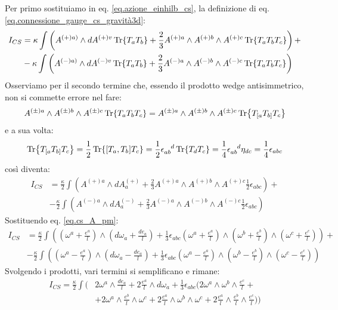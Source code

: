 Per primo sostituiamo in eq. \ref{eq.azione_einhilb_cs}, la definizione di eq. \ref{eq.connessione_gauge_cs_gravità3d}:
\begin{align*}
    I_{CS} &= \kappa\int\left( A^{(+)a)}\wedge dA^{(+)v}\Tr{T_a T_b} + \frac{2}{3}A^{(+)a}\wedge A^{(+)b}\wedge A^{(+)c}\Tr{T_aT_bT_c}\right) + \\
    &- \kappa\int\left( A^{(-)a)}\wedge dA^{(-)v}\Tr{T_a T_b} + \frac{2}{3}A^{(-)a}\wedge A^{(-)b}\wedge A^{(-)c}\Tr{T_aT_bT_c}\right)
\end{align*}      
Osserviamo per il secondo termine che, essendo il prodotto wedge antisimmetrico, non si commette errore nel fare:
\begin{equation*}
    A^{(\pm)a}\wedge A^{(\pm)b}\wedge A^{(\pm)c}\Tr{T_aT_bT_c} =  A^{(\pm)a}\wedge A^{(\pm)b}\wedge A^{(\pm)c}\Tr{T_{[a}T_{b]}T_c}
\end{equation*}
e a sua volta:
\begin{equation*}
    \Tr{T_{[a}T_{b]}T_c} = \frac{1}{2}\Tr{[T_a, T_b]T_c} = \frac{1}{2}\tensor{\epsilon}{_{ab}^d}\Tr{T_dT_c} = \frac{1}{4}\tensor{\epsilon}{_{ab}^d}\eta_{dc} = \frac{1}{4}\epsilon_{abc}
\end{equation*}
così diventa:
\begin{align*}
    I_{CS} &= \frac{\kappa}{2} \int\left( A^{(+)a}\wedge dA^{(+)}_a + \frac{2}{3}A^{(+)a}\wedge A^{(+)b}\wedge A^{(+)c}\frac{1}{2}\epsilon_{abc} \right) + \\
    &- \frac{\kappa}{2} \int\left( A^{(-)a}\wedge dA^{(-)}_a + \frac{2}{3}A^{(-)a}\wedge A^{(-)b}\wedge A^{(-)c}\frac{1}{2}\epsilon_{abc} \right)
\end{align*}
Sostituendo eq. \ref{eq.cs_A_pm}:
\begin{align*}
    I_{CS} &= \frac{\kappa}{2} \int\left( (\omega^a + \frac{e^a}{l})\wedge (d\omega_a + \frac{de_a}{l}) + \frac{1}{3}\epsilon_{abc} (\omega^a + \frac{e^a}{l})\wedge (\omega^b + \frac{e^b}{l})\wedge (\omega^c + \frac{e^c}{l}) \right) + \\
    &- \frac{\kappa}{2} \int\left( (\omega^a - \frac{e^a}{l})\wedge (d\omega_a - \frac{de_a}{l}) + \frac{1}{3}\epsilon_{abc}(\omega^a - \frac{e^a}{l})\wedge (\omega^b - \frac{e^b}{l})\wedge (\omega^c - \frac{e^c}{l}) \right)
\end{align*}
Svolgendo i prodotti, vari termini si semplificano e rimane:
\begin{align*}
    I_{CS} = \frac{\kappa}{2} \int (& 2\omega^a\wedge\frac{de_a}{l} + 2\frac{e^a}{l}\wedge d\omega_a + \frac{1}{3}\epsilon_{abc}(2\omega^a\wedge\omega^b\wedge\frac{e^c}{l} +\\ & + 2\omega^a\wedge\frac{e^b}{l}\wedge \omega^c + 2 \frac{e^a}{l}\wedge \omega^b\wedge\omega^c + 2\frac{e^a}{l}\wedge \frac{e^b}{l}\wedge \frac{e^c}{l}) )
\end{align*}

